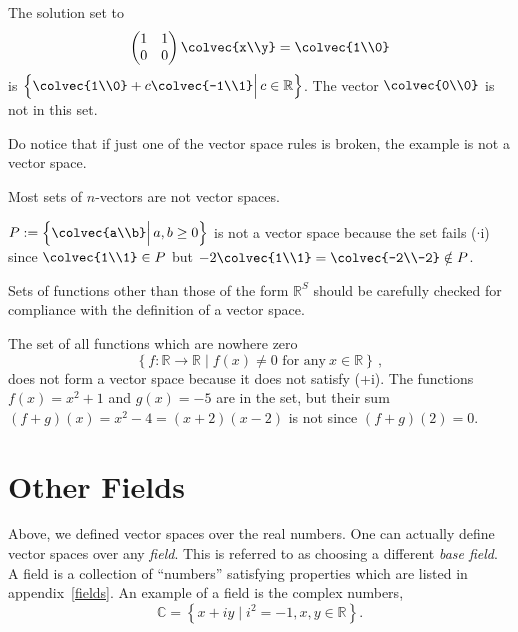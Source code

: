\begin{example} 
The solution set to 
\[  \begin{pmatrix}
      1 & 1 \\
      0 & 0 
    \end{pmatrix} \colvec{x\\y} = \colvec{1\\0} \]
is  $\left\{ \colvec{1\\0} + c \colvec{-1\\1} \Big|\, c \in \mathbb{R} \right\}$.
The vector $\colvec{0\\0}$ is not in this set.
\end{example}
Do notice that if just one of the vector space rules is broken, the example is not a vector space.

Most sets of $n$-vectors are not vector spaces. 
\begin{example} 
$P:=\left \{ \colvec{a\\b} \Big| \,a,b \geq 0 \right\}$ is not a vector space because the set fails ($\cdot$i) since 
$\colvec{1\\1}\in P$ but $-2\colvec{1\\1} =\colvec{-2\\-2} \notin P$.
\end{example}


Sets of functions other than those of the form $\mathbb{R}^S$ should be carefully checked for compliance with the definition of a vector space.


\begin{example}
The set of all functions which are nowhere zero 
\[\left\{ f \colon \mathbb{R}\rightarrow \mathbb{R} \mid f(x)\neq 0 \text{~for~any}~x\in\mathbb{R} \right\}\, ,\]
does not form a vector space because it does not satisfy (+i). The functions $f(x)=x^2+1$ and $g(x)= -5$ are in the set, but their sum $(f+g)(x)=x^2-4=(x+2)(x-2)$ is not since $(f+g)(2)=0$.
\end{example}


\section{Other Fields} \label{otherfields}
Above, we defined vector spaces over the real numbers.  One can actually define vector spaces over any \emph{field}.
This is referred to as choosing a different {\itshape base field}.
  A field is a collection of ``numbers'' satisfying  properties which are listed in appendix~\ref{fields}.
An example of a field is the complex numbers, 
\[
\mathbb{C}= \left\{x+iy \mid i^2=-1, x,y\in \mathbb{R} \right\}.
\]

